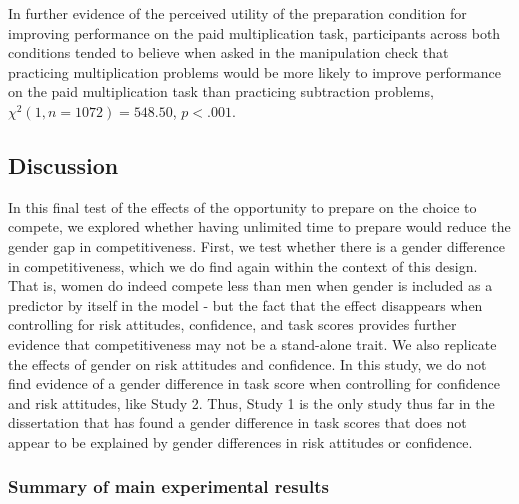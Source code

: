 \documentclass[a4paper, nobind]{templates/ociamthesis}
\begin{document}
In further evidence of the perceived utility of the preparation condition for improving performance on the paid multiplication task, participants across both conditions tended to believe when asked in the manipulation check that practicing multiplication problems would be more likely to improve performance on the paid multiplication task than practicing subtraction problems, \(\chi^2(1, n = 1072) = 548.50\), \(p < .001\).

\hypertarget{discussion-2}{%
\subsection{Discussion}\label{discussion-2}}

In this final test of the effects of the opportunity to prepare on the choice to compete, we explored whether having unlimited time to prepare would reduce the gender gap in competitiveness. First, we test whether there is a gender difference in competitiveness, which we do find again within the context of this design. That is, women do indeed compete less than men when gender is included as a predictor by itself in the model - but the fact that the effect disappears when controlling for risk attitudes, confidence, and task scores provides further evidence that competitiveness may not be a stand-alone trait. We also replicate the effects of gender on risk attitudes and confidence. In this study, we do not find evidence of a gender difference in task score when controlling for confidence and risk attitudes, like Study 2. Thus, Study 1 is the only study thus far in the dissertation that has found a gender difference in task scores that does not appear to be explained by gender differences in risk attitudes or confidence.

\hypertarget{summary-of-main-experimental-results-2}{%
\subsubsection{Summary of main experimental results}\label{summary-of-main-experimental-results-2}}
\end{document}
